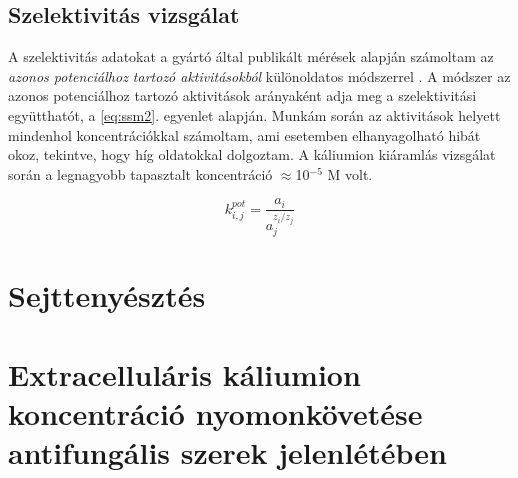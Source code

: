 \subsection{Szelektivitás vizsgálat}

A szelektivitás adatokat a gyártó által publikált mérések alapján \cite{thermo} számoltam az \emph{azonos potenciálhoz tartozó aktivitásokból} különoldatos módszerrel \cite{buck1994recommendations}. A módszer az azonos potenciálhoz tartozó aktivitások arányaként adja meg a szelektivitási együtthatót, a \ref{eq:ssm2}. egyenlet alapján. Munkám során az aktivitások helyett mindenhol koncentrációkkal számoltam, ami esetemben elhanyagolható hibát okoz, tekintve, hogy híg oldatokkal dolgoztam. A káliumion kiáramlás vizsgálat során a legnagyobb tapasztalt koncentráció $\approx$10$^{-5}$ M volt.

\begin{equation}
k_{i,j}^{pot}=\frac{a_i}{a_j^{z_i/z_j}}
\label{eq:ssm2}
\end{equation}

\section{Sejttenyésztés}


\section{Extracelluláris káliumion koncentráció nyomonkövetése antifungális szerek jelenlétében}


